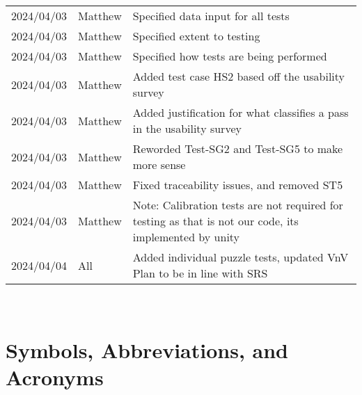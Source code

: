 \documentclass[12pt, titlepage]{article}
\begin{document}
\begin{tabularx}{\textwidth}{p{3cm}p{2cm}X}
2024/04/03 & Matthew & Specified data input for all tests\\
2024/04/03 & Matthew & Specified extent to testing\\
2024/04/03 & Matthew & Specified how tests are being performed\\
2024/04/03 & Matthew & Added test case HS2 based off the usability survey\\
2024/04/03 & Matthew & Added justification for what classifies a pass in the usability survey\\
2024/04/03 & Matthew & Reworded Test-SG2 and Test-SG5 to make more sense\\
2024/04/03 & Matthew & Fixed traceability issues, and removed ST5\\
2024/04/03 & Matthew & Note: Calibration tests are not required for testing as that is not our code, its implemented by unity\\
2024/04/04 & All & Added individual puzzle tests, updated VnV Plan to be in line with SRS\\
\bottomrule
\end{tabularx}

~\\


\newpage

\tableofcontents

\listoftables

\newpage

\section{Symbols, Abbreviations, and Acronyms}
\end{document}
